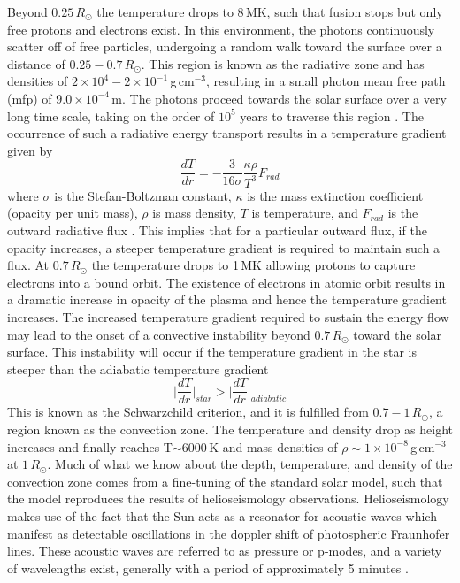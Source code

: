 Beyond $0.25\,R_{\odot}$ the temperature drops to 8\,MK, such that fusion stops but only free protons and electrons exist. In this environment, the photons continuously scatter off of free particles, undergoing a random walk toward the surface over a distance of $0.25-0.7\,R_{\odot}$. This region is known as the radiative zone and has densities of $2\times10^4-2\times10^{-1}$\,g\,cm$^{-3}$, resulting in a small photon mean free path (mfp) of $9.0\times10^{-4}$\,m. The photons proceed towards the solar surface over a very long time scale, taking on the order of $10^{5}$ years to traverse this region \citep{mitalas1992}. The occurrence of such a radiative energy transport results in a temperature gradient given by 
\begin{equation}
\frac{dT}{dr} = -\frac{3}{16 \sigma}\frac{\kappa \rho}{T^3}F_{rad}
\end{equation}
where $\sigma$ is the Stefan-Boltzman constant, $\kappa$ is the mass extinction coefficient (opacity per unit mass), $\rho$ is mass density, $T$ is temperature, and $F_{rad}$ is the outward radiative flux \citep{foukal2004}. This implies that for a particular outward flux, if the opacity increases, a steeper temperature gradient is required to maintain such a flux. At $0.7\,R_{\odot}$ the temperature drops to 1\,MK allowing protons to capture electrons into a bound orbit. The existence of electrons in atomic orbit results in a dramatic increase in opacity of the plasma \citep{turk2011} and hence the temperature gradient increases. The increased temperature gradient required to sustain the energy flow may lead to the onset of a convective instability beyond $0.7\,R_{\odot}$ toward the solar surface. This instability will occur if the temperature gradient in the star is steeper than the adiabatic temperature gradient 
\begin{equation}
\Bigg|\frac{dT}{dr}\Bigg|_{star} > \Bigg|\frac{dT}{dr}\Bigg|_{adiabatic}
\end{equation}
This is known as the Schwarzchild criterion, and it is fulfilled from $0.7-1\,R_{\odot}$, a region known as the convection zone. The temperature and density drop as height increases and finally reaches T$\sim$$6000$\,K and mass densities of $\rho\sim1\times10^{-8}$\,g\,cm$^{-3}$ at $1\,R_{\odot}$. Much of what we know about the depth, temperature, and density of the convection zone comes from a fine-tuning of the standard solar model, such that the model reproduces the results of helioseismology observations. Helioseismology makes use of the fact that the Sun acts as a resonator for acoustic waves which manifest as detectable oscillations in the doppler shift of photospheric Fraunhofer lines. These acoustic waves are referred to as pressure or p-modes, and a variety of wavelengths exist, generally with a period of approximately 5 minutes \citep{turk2011}. 

